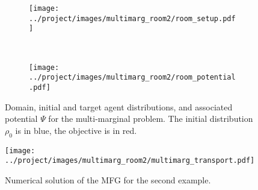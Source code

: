 \documentclass[../report.tex]{subfiles}
\begin{document}
\begin{figure}[h]
	\centering
	\begin{subfigure}[b]{.3\linewidth}
	\texttt{[image: ../project/images/multimarg\_room2/room\_setup.pdf]}
	\end{subfigure}~
	\begin{subfigure}[b]{.39\linewidth}
	\texttt{[image: ../project/images/multimarg\_room2/room\_potential.pdf]}
	\end{subfigure}
	\caption{Domain, initial and target agent distributions, and associated potential $\Psi$ for the multi-marginal problem. The initial distribution $\rho_0$ is in blue, the objective is in red.}\label{fig:NMarg2DomainPot}
\end{figure}

\begin{figure}
	\centering
	\texttt{[image: ../project/images/multimarg\_room2/multimarg\_transport.pdf]}
	\caption{Numerical solution of the MFG for the second example.}\label{fig:NMarg2Steps}
\end{figure}
\end{document}
